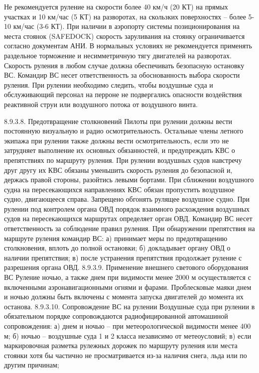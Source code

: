 Не рекомендуется руление на скорости более 40 км/ч (20 КТ) на прямых участках и 10 км/час (5 КТ) на разворотах, на скользких поверхностях – более 5-10 км/час (3-6 КТ). 
При наличии в аэропорту системы позиционирования на места стоянок (SAFEDOCK) скорость заруливания на стоянку ограничивается согласно документам АНИ. 
В нормальных условиях не рекомендуется применять раздельное торможение и несимметричную тягу двигателей на разворотах. 
Скорость руления в любом случае должна обеспечивать безопасную остановку ВС. 
Командир ВС несет ответственность за обоснованность выбора скорости руления. 
При рулении необходимо следить, чтобы воздушные суда и обслуживающий персонал на перроне не подвергались опасности воздействия реактивной струи или воздушного потока от воздушного винта. 

8.9.3.8.	Предотвращение столкновений
Пилоты при рулении должны вести постоянную визуальную и радио осмотрительность. Остальные члены летного экипажа при рулении также должны вести осмотрительность, если это не затрудняет выполнение их основных обязанностей, и предупреждать КВС о препятствиях по маршруту руления.
При рулении воздушных судов навстречу друг другу их КВС обязаны уменьшить скорость руления до безопасной и, держась правой стороны, разойтись левыми бортами. 
При сближении воздушного судна на пересекающихся направлениях КВС обязан пропустить воздушное судно, двигающееся справа. 
Запрещено обгонять рулящее воздушное судно. 
При рулении под контролем органа ОВД порядок взаимного расхождения воздушных судов на пересекающихся маршрутах определяет орган ОВД. 
Командир ВС несет ответственность за соблюдение правил руления. 
При обнаружении препятствия на маршруте руления командир ВС: 
а)	принимает меры по предотвращению столкновения, вплоть до полной остановки; 
б)	докладывает органу ОВД о наличии препятствия; 
в)	после устранения препятствия продолжает руление с разрешения органа ОВД. 
8.9.3.9.	Применение внешнего светового оборудования ВС 
Руление ночью, а также днем при видимости менее 2000 м осуществляется с включенными аэронавигационными огнями и фарами.
Проблесковые маяки днем и ночью должны быть включены с момента запуска двигателей до момента их останова. 
8.9.3.10.	Сопровождение ВС на рулении
Воздушные суда при рулении в обязательном порядке сопровождаются радиофицированной автомашиной сопровождения: 
а)	днем и ночью – при метеорологической видимости менее 400 м; 
б)	ночью – воздушные суда 1 и 2 класса независимо от метеоусловий; 
в)	если маркировочная разметка рулежных дорожек по маршруту руления или места стоянки хотя бы частично не просматривается из-за наличия снега, льда или по другим причинам; 
